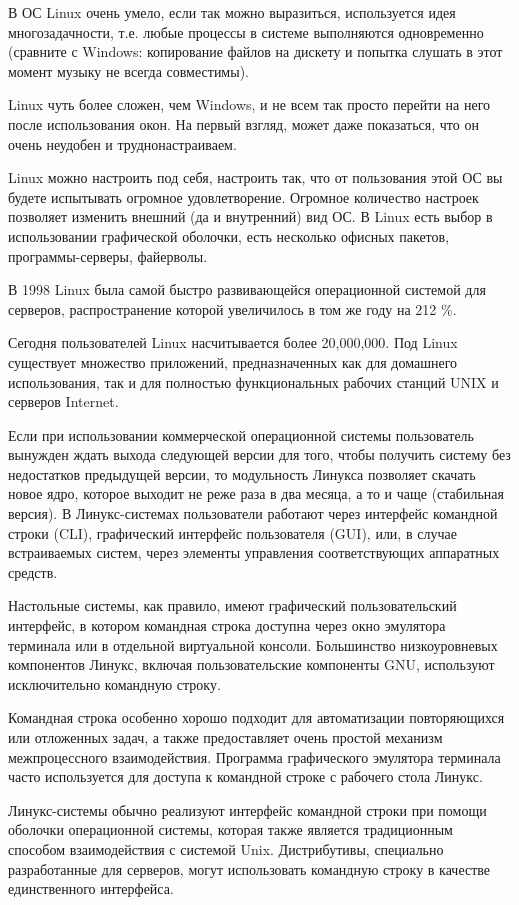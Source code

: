 В ОС Linux очень умело, если так можно выразиться, используется идея многозадачности, т.е. любые процессы в системе выполняются одновременно (сравните с Windows: копирование файлов на дискету и попытка слушать в этот момент музыку не всегда совместимы).

Linux чуть более сложен, чем Windows, и не всем так просто перейти на него после использования окон. На первый взгляд, может даже показаться, что он очень неудобен и труднонастраиваем.

Linux можно настроить под себя, настроить так, что от пользования этой ОС вы будете испытывать огромное удовлетворение. Огромное количество настроек позволяет изменить внешний (да и внутренний) вид ОС. В Linux есть выбор в использовании графической оболочки, есть несколько офисных пакетов, программы-серверы, файерволы.

В 1998 Linux была самой быстро развивающейся операционной системой для серверов, распространение которой увеличилось в том же году на 212 \%.

Сегодня пользователей Linux насчитывается более 20,000,000. Под Linux существует множество приложений, предназначенных как для домашнего использования, так и для полностью функциональных рабочих станций UNIX и серверов Internet.

Если при использовании коммерческой операционной системы пользователь вынужден ждать выхода следующей версии для того, чтобы получить систему без недостатков предыдущей версии, то модульность Линукса позволяет скачать новое ядро, которое выходит не реже раза в два месяца, а то и чаще (стабильная версия). В Линукс-системах пользователи работают через интерфейс командной строки (CLI), графический интерфейс пользователя (GUI), или, в случае встраиваемых систем, через элементы управления соответствующих аппаратных средств.

Настольные системы, как правило, имеют графический пользовательский интерфейс, в котором командная строка доступна через окно эмулятора терминала или в отдельной виртуальной консоли. Большинство низкоуровневых компонентов Линукс, включая пользовательские компоненты GNU, используют исключительно командную строку.

Командная строка особенно хорошо подходит для автоматизации повторяющихся или отложенных задач, а также предоставляет очень простой механизм межпроцессного взаимодействия. Программа графического эмулятора терминала часто используется для доступа к командной строке с рабочего стола Линукс.

Линукс-системы обычно реализуют интерфейс командной строки при помощи оболочки операционной системы, которая также является традиционным способом взаимодействия с системой Unix. Дистрибутивы, специально разработанные для серверов, могут использовать командную строку в качестве единственного интерфейса.

